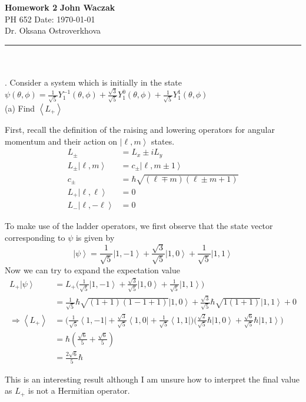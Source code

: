 \documentclass[a4paper, 11pt]{article}
\newcommand{\bra}[1]{\ensuremath{\left\langle#1\right|}}
\newcommand{\ket}[1]{\ensuremath{\left|#1\right\rangle}}
\newcommand{\expectation}[1]{\ensuremath{\left\langle #1 \right\rangle}}
\newenvironment{solution}{%
	\begin{list}{}{%
			\setlength{\topsep}{0pt}%
			\setlength{\leftmargin}{1.5cm}%
			\setlength{\rightmargin}{1.5cm}%
			\setlength{\listparindent}{\parindent}%
			\setlength{\itemindent}{\parindent}%
			\setlength{\parsep}{\parskip}%
		}%
		\item[]}{\end{list}}
\begin{document}
\noindent
\large\textbf{Homework 2} \hfill \textbf{John Waczak} \\
\normalsize PH 652 \hfill  Date: \today \\
Dr. Oksana Ostroverkhova  
\par\noindent\rule{\textwidth}{0.4pt} \\\\

. Consider a system which is initially in the state $\psi(\theta, \phi) = \frac{1}{\sqrt{5}}Y_1^{-1}(\theta,\phi)+\frac{\sqrt{3}}{\sqrt{5}}Y_1^0(\theta, \phi)+\frac{1}{\sqrt{5}}Y_1^1(\theta,\phi)$ \\

\noindent (a) Find $\expectation{L_+}$ \\ 
\begin{solution}
  \noindent First, recall the definition of the raising and lowering operators for angular momentum and their action on $\ket{\ell, m}$ states.
  \begin{align*}
    L_\pm &= L_x \pm iL_y \\
    L_\pm \ket{\ell, m} &= c_\pm \ket{\ell, m\pm1} \\
    c_\pm &= \hbar\sqrt{(\ell\mp m)(\ell \pm m + 1)} \\
    L_+\ket{\ell, \ell} &= 0 \\
    L_-\ket{\ell, -\ell} &= 0
  \end{align*}


  \noindent To make use of the ladder operators, we first observe that the state vector corresponding to $\psi$ is given by
  \begin{equation*}
    \ket{\psi} = \frac{1}{\sqrt{5}}\ket{1, -1} + \frac{\sqrt{3}}{\sqrt{5}}\ket{1,0} + \frac{1}{\sqrt{5}}\ket{1,1}
  \end{equation*}
  Now we can try to expand the expectation value
  \begin{align*}
    L_+\ket{\psi}&=L_+\Big(\frac{1}{\sqrt{5}}\ket{1, -1} + \frac{\sqrt{3}}{\sqrt{5}}\ket{1,0} + \frac{1}{\sqrt{5}}\ket{1,1}\Big) \\
    &= \frac{1}{\sqrt{5}}\hbar\sqrt{(1+1)(1-1+1)}\ket{1,0} + \frac{\sqrt{3}}{\sqrt{5}}\hbar\sqrt{1(1+1)}\ket{1,1} + 0 \\
    \Rightarrow \expectation{L_+} &= \Big(\frac{1}{\sqrt{5}}\bra{1, -1} + \frac{\sqrt{3}}{\sqrt{5}}\bra{1,0} + \frac{1}{\sqrt{5}}\bra{1,1}\Big)\Big(\frac{\sqrt{2}}{\sqrt{5}}\hbar\ket{1,0}+\frac{\sqrt{6}}{\sqrt{5}}\hbar\ket{1,1}\Big) \\
    &= \hbar\left( \frac{\sqrt{6}}{5} + \frac{\sqrt{6}}{5} \right) \\ 
    &= \frac{2\sqrt{6}}{5}\hbar
  \end{align*}

\noindent This is an interesting result although I am unsure how to interpret the final value as $L_+$ is not a Hermitian operator. \\
\end{solution}
\end{document}
